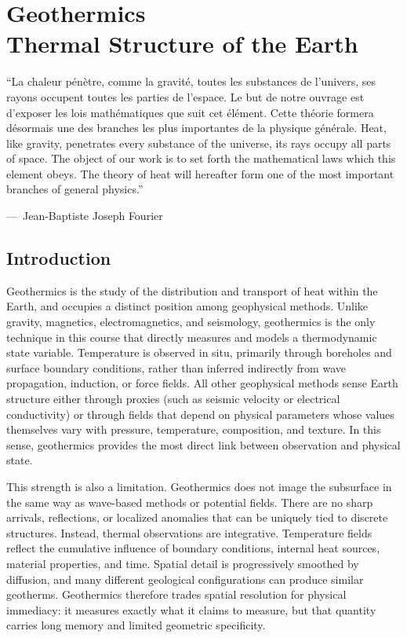 \def\hfu{mW~m\ensuremath{^{-2}}}
\def\hgu{\ensuremath{\mu}W~m\ensuremath{^{-3}}}
\def\tcu{W~m\ensuremath{^{-1}}K\ensuremath{^{-1}}}

\chapter[Geothermics: Thermal Structure of the Earth]{Geothermics\\ {\LARGE Thermal Structure of the Earth}}\label{ch:geothermics1}
\epigraph{ ``La chaleur p{\'e}n{\`e}tre, comme la gravit{\'e}, toutes les substances de l'univers, ses rayons occupent toutes les parties de l'espace. Le but de notre ouvrage est d'exposer les lois math{\'e}matiques que suit cet {\'e}l{\'e}ment. Cette th{\'e}orie formera d{\'e}sormais une des branches les plus importantes de la physique g{\'e}n{\'e}rale.
Heat, like gravity, penetrates every substance of the universe, its rays occupy all parts of space. The object of our work is to set forth the mathematical laws which this element obeys. The theory of heat will hereafter form one of the most important branches of general physics.''}
{{\normalfont ---\ Jean-Baptiste Joseph Fourier}}

\section{Introduction}
Geothermics is the study of the distribution and transport of heat within the Earth, and occupies a distinct position among geophysical methods. Unlike gravity, magnetics, electromagnetics, and seismology, geothermics is the only technique in this course that directly measures and models a thermodynamic state variable. Temperature is observed in situ, primarily through boreholes and surface boundary conditions, rather than inferred indirectly from wave propagation, induction, or force fields. All other geophysical methods sense Earth structure either through proxies (such as seismic velocity or electrical conductivity) or through fields that depend on physical parameters whose values themselves vary with pressure, temperature, composition, and texture. In this sense, geothermics provides the most direct link between observation and physical state.

This strength is also a limitation. Geothermics does not image the subsurface in the same way as wave-based methods or potential fields. There are no sharp arrivals, reflections, or localized anomalies that can be uniquely tied to discrete structures. Instead, thermal observations are integrative. Temperature fields reflect the cumulative influence of boundary conditions, internal heat sources, material properties, and time. Spatial detail is progressively smoothed by diffusion, and many different geological configurations can produce similar geotherms. Geothermics therefore trades spatial resolution for physical immediacy: it measures exactly what it claims to measure, but that quantity carries long memory and limited geometric specificity.


